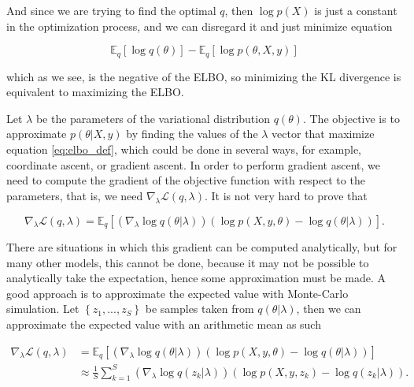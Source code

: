 And since we are trying to find the optimal $q$, then $\log p(X)$ is just a constant in the optimization process, and we can disregard it and just minimize equation

$$
  \mathbb{E}_q \left[ \log  q(\theta) \right] - \mathbb{E}_q \left[ \log p(\theta, X, y) \right]
$$

which as we see, is the negative of the ELBO, so minimizing the KL divergence is equivalent to maximizing the ELBO.

Let $\lambda$ be the parameters of the variational distribution $q(\theta)$. The objective is to approximate $p(\theta | X, y)$ by finding the values of the $\lambda$ vector that maximize equation \ref{eq:elbo_def}, which could be done in several ways, for example, coordinate ascent, or gradient ascent. In order to perform gradient ascent, we need to compute the gradient of the objective function with respect to the parameters, that is, we need $\nabla_{\lambda} \mathcal{L}(q, \lambda)$. It is not very hard to prove that

\begin{equation}
  \label{eq:ELBO_gradient}
  \nabla_{\lambda} \mathcal{L}(q, \lambda) =
  \mathbb{E}_q \left[ \left( \nabla_{\lambda} \log q(\theta | \lambda) \right) \left( \log p(X, y, \theta) - \log q(\theta | \lambda) \right) \right].
\end{equation}

There are situations in which this gradient can be computed analytically, but for many other models, this cannot be done, because it may not be possible to analytically take the expectation, hence some approximation must be made. A good approach is to approximate the expected value with Monte-Carlo simulation. Let $\left\{ z_1, ..., z_S \right\}$ be samples taken from $q(\theta | \lambda)$, then we can approximate the expected value with an arithmetic mean as such

\begin{equation*}
  \begin{split}
  \nabla_{\lambda} \mathcal{L}(q, \lambda) &=
  \mathbb{E}_q \left[ \left( \nabla_{\lambda} \log q(\theta | \lambda) \right) \left( \log p(X, y, \theta) - \log q(\theta | \lambda) \right) \right] \\
  & \approx \frac{1}{S} \sum_{k = 1}^S \left( \nabla_{\lambda} \log q(z_k | \lambda) \right) \left( \log p(X, y, z_k) - \log q(z_k | \lambda) \right).
  \end{split}
\end{equation*}


